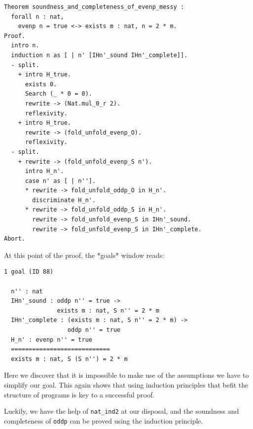 \documentclass{article}
\begin{document}
\begin{lstlisting}
Theorem soundness_and_completeness_of_evenp_messy :
  forall n : nat,
    evenp n = true <-> exists m : nat, n = 2 * m.
Proof.
  intro n.
  induction n as [ | n' [IHn'_sound IHn'_complete]].
  - split.
    + intro H_true.
      exists 0.
      Search (_ * 0 = 0).
      rewrite -> (Nat.mul_0_r 2).
      reflexivity.
    + intro H_true.
      rewrite -> (fold_unfold_evenp_O).
      reflexivity.
  - split.
    + rewrite -> (fold_unfold_evenp_S n').
      intro H_n'.
      case n' as [ | n''].
      * rewrite -> fold_unfold_oddp_O in H_n'.
        discriminate H_n'.
      * rewrite -> fold_unfold_oddp_S in H_n'.
        rewrite -> fold_unfold_evenp_S in IHn'_sound.
        rewrite -> fold_unfold_evenp_S in IHn'_complete.
Abort.
\end{lstlisting}

At this point of the proof, the *goals* window reads:

\begin{lstlisting}
1 goal (ID 88)
  
  n'' : nat
  IHn'_sound : oddp n'' = true ->
               exists m : nat, S n'' = 2 * m
  IHn'_complete : (exists m : nat, S n'' = 2 * m) ->
                  oddp n'' = true
  H_n' : evenp n'' = true
  ============================
  exists m : nat, S (S n'') = 2 * m
\end{lstlisting}

Here we discover that it is impossible to make use of the assumptions we have to simplify our goal. This again shows that using induction principles that befit the structure of programs is key to a successful proof. 

Luckily, we have the help of \texttt{nat\_ind2} at our disposal, and the soundness and completeness of \texttt{oddp} can be proved using the induction principle.
\end{document}
